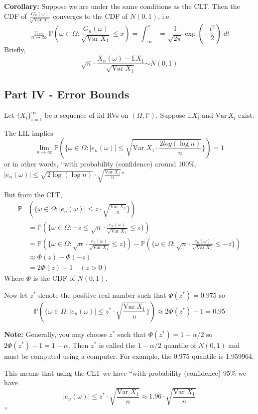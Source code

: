 \documentclass[12pt]{article}
\renewcommand{\P}{\mathbb{P}}
\newcommand{\E}{\mathbb{E}}
\newcommand{\Var}{\text{Var}\;}
\begin{document}
\textbf{Corollary:} Suppose we are under the same conditions as the CLT. Then the CDF of $\frac{G_n(\omega)}{\sqrt{\Var X_1}}$ converges to the CDF of $N(0, 1)$, i.e.
\[\lim_{n\to \infty}\P(\omega \in \Omega: \frac{G_n(\omega)}{\sqrt{\Var X_1}} \leq x) = \int_{-\infty}^x = \frac{1}{\sqrt{2\pi}} \exp\left(-\frac{t^2}{2}\right)\; dt\]
Briefly, 
\[\sqrt{n} \cdot \frac{\bar X_n(\omega) - \E X_1}{\sqrt{\Var X_1}}\dot \sim N(0, 1)\]

\subsection*{Part IV - Error Bounds}
Let $\{X_i\}_{i=1}^\infty$ be a sequence of iid RVs on $(\Omega, \P)$. Suppose $\E X_i$ and $\text{Var}\, X_i$ exist. 

The LIL implies 
\[\lim_{n\to \infty} \P\left(\{\omega \in \Omega : |e_n(\omega)| \leq \sqrt{\Var X_1 \cdot \frac{2
log(\log n)}{n}}\}\right) = 1\] 
or in other words, ``with probability (confidence) around 100\%, $|e_n(\omega)| \leq \sqrt{2\log(\log n)} \cdot \sqrt{\frac{\Var X_1}{n}}$''

But from the CLT,
\begin{align*}
    \P&\left(\{\omega \in \Omega : |e_n(\omega)| \leq z \cdot \sqrt{\frac{\Var X_1}{n}}\}\right)\\
    &=  \P\left(\{\omega \in \Omega : -z \leq \sqrt{n} \cdot \frac{e_n(\omega)}{\sqrt{\Var X_1}} \leq z\}\right)\\
    &= \P\left(\{\omega \in \Omega : \sqrt{n} \cdot \frac{e_n(\omega)}{\sqrt{\Var X_1}} \leq z\}\right) - \P\left(\{\omega \in \Omega : \sqrt{n} \cdot \frac{e_n(\omega)}{\sqrt{\Var X_1}} \leq -z\}\right)\\
    &\approx \Phi(z) - \Phi(-z)\\
    &= 2\Phi(z) - 1 \quad (z > 0)
\end{align*}
Where $\Phi$ is the CDF of $N(0,1)$.

Now let $z^*$ denote the positive real number such that $\Phi(z^*) = 0.975$ so 
\[ \P\left(\{\omega \in \Omega : |e_n(\omega)| \leq z^* \cdot \sqrt{\frac{\Var X_1}{n}}\}\right) \approx 2\Phi(z^*) - 1 = 0.95\]

\textbf{Note:} Generally, you may choose $z^*$ such that $\Phi(z^*) = 1 - \alpha /2$ so $2\Phi(z^*)- 1 = 1-\alpha$. Then $z^*$ is called the $1 - \alpha/2$ quantile of $N(0,1)$ and must be computed using a computer. For example, the 0.975 quantile is 1.959964. 

This means that using the CLT we have ``with probability (confidence) 95\% we have 
\[|e_n(\omega)| \leq z^* \cdot \sqrt{\frac{\Var X_1}{n}} \approx 1.96\cdot \sqrt{\frac{\Var X_1}{n}} \]''
\end{document}
